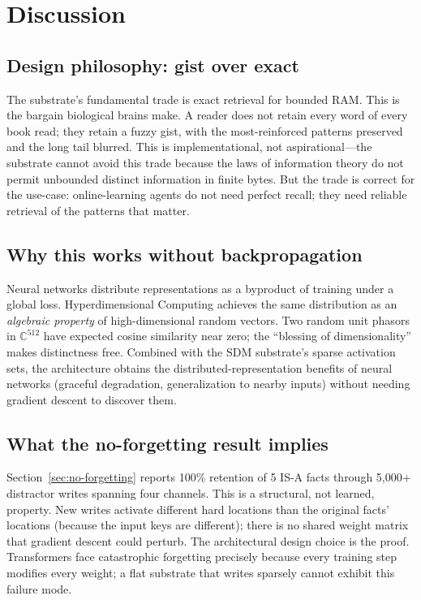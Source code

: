 \documentclass[11pt,a4paper]{article}
\begin{document}
\section{Discussion}
\label{sec:discussion}

\subsection{Design philosophy: gist over exact}
The substrate's fundamental trade is exact retrieval for bounded RAM.
This is the bargain biological brains make.  A reader does not retain
every word of every book read;  they retain a fuzzy gist, with the
most-reinforced patterns preserved and the long tail blurred.  This is
implementational, not aspirational---the substrate cannot avoid this
trade because the laws of information theory \cite{shannon1948mathematical}
do not permit unbounded distinct information in finite bytes.  But the
trade is correct for the use-case:  online-learning agents do not need
perfect recall;  they need reliable retrieval of the patterns that
matter.

\subsection{Why this works without backpropagation}
Neural networks distribute representations as a byproduct of training
under a global loss.  Hyperdimensional Computing achieves the same
distribution as an \emph{algebraic property} of high-dimensional random
vectors.  Two random unit phasors in $\mathbb{C}^{512}$ have expected
cosine similarity near zero;  the ``blessing of dimensionality'' makes
distinctness free.  Combined with the SDM substrate's sparse activation
sets, the architecture obtains the distributed-representation benefits
of neural networks (graceful degradation, generalization to nearby
inputs) without needing gradient descent to discover them.

\subsection{What the no-forgetting result implies}
Section~\ref{sec:no-forgetting} reports 100\% retention of 5 IS-A facts
through 5{,}000+ distractor writes spanning four channels.  This is a
structural, not learned, property.  New writes activate different hard
locations than the original facts' locations (because the input keys
are different);  there is no shared weight matrix that gradient descent
could perturb.  The architectural design choice is the proof.
Transformers face catastrophic forgetting precisely because every
training step modifies every weight;  a flat substrate that writes
sparsely cannot exhibit this failure mode.
\end{document}
